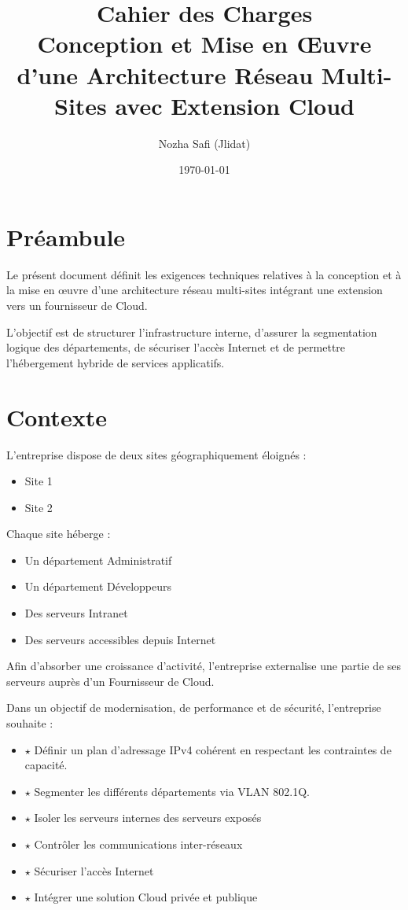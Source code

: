 \documentclass[11pt,a4paper]{article}
\title{\textbf{Cahier des Charges}\\
	Conception et Mise en Œuvre d’une Architecture Réseau Multi-Sites avec Extension Cloud}
\author{Nozha Safi (Jlidat)}
\date{\today}
\begin{document}
	
	\maketitle
	\thispagestyle{empty}
	\newpage
	\tableofcontents
	\newpage
	
	\section{Préambule}
	
	Le présent document définit les exigences techniques relatives à la conception
	et à la mise en œuvre d’une architecture réseau multi-sites intégrant une
	extension vers un fournisseur de Cloud.
	
	L’objectif est de structurer l’infrastructure interne, d’assurer la
	segmentation logique des départements, de sécuriser l’accès Internet et
	de permettre l’hébergement hybride de services applicatifs.
	
	\section{Contexte}
	
	L’entreprise dispose de deux sites géographiquement éloignés :
	
	\begin{itemize}
		\item Site 1
		\item Site 2
	\end{itemize}
	
	Chaque site héberge :
	
	\begin{itemize}
		\item Un département Administratif
		\item Un département Développeurs
		\item Des serveurs Intranet
		\item Des serveurs accessibles depuis Internet
	\end{itemize}
	
	Afin d’absorber une croissance d’activité, l’entreprise externalise
	une partie de ses serveurs auprès d’un Fournisseur de Cloud.
	
	Dans un objectif de modernisation, de performance et de sécurité, l'entreprise souhaite :
	\begin{itemize}
		\item{$\star$} Définir un plan d’adressage IPv4 cohérent en respectant les contraintes de capacité.  
		\item{$\star$} Segmenter les différents départements via VLAN 802.1Q.   
		\item{$\star$} Isoler les serveurs internes des serveurs exposés  
		\item{$\star$} Contrôler les communications inter-réseaux
		\item{$\star$} Sécuriser l'accès Internet
		\item{$\star$} Intégrer une solution Cloud privée et publique 
	\end{itemize}
	
\end{document}
